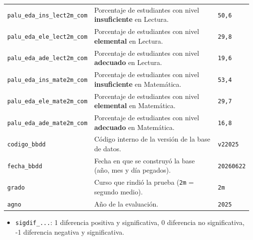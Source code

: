 \documentclass[10.5pt]{article}
\begin{document}
\begin{xltabular}{\linewidth}{@{}p{4.5cm} >{\raggedright\arraybackslash}X p{3.4cm}@{}}
\texttt{palu\_\allowbreak{}eda\_\allowbreak{}ins\_\allowbreak{}lect2m\_\allowbreak{}com} & Porcentaje de estudiantes con nivel \textbf{insuficiente} en Lectura. & \texttt{50,6} \\
\texttt{palu\_\allowbreak{}eda\_\allowbreak{}ele\_\allowbreak{}lect2m\_\allowbreak{}com} & Porcentaje de estudiantes con nivel \textbf{elemental} en Lectura. & \texttt{29,8} \\
\texttt{palu\_\allowbreak{}eda\_\allowbreak{}ade\_\allowbreak{}lect2m\_\allowbreak{}com} & Porcentaje de estudiantes con nivel \textbf{adecuado} en Lectura. & \texttt{19,6} \\
\texttt{palu\_\allowbreak{}eda\_\allowbreak{}ins\_\allowbreak{}mate2m\_\allowbreak{}com} & Porcentaje de estudiantes con nivel \textbf{insuficiente} en Matemática. & \texttt{53,4} \\
\texttt{palu\_\allowbreak{}eda\_\allowbreak{}ele\_\allowbreak{}mate2m\_\allowbreak{}com} & Porcentaje de estudiantes con nivel \textbf{elemental} en Matemática. & \texttt{29,7} \\
\texttt{palu\_\allowbreak{}eda\_\allowbreak{}ade\_\allowbreak{}mate2m\_\allowbreak{}com} & Porcentaje de estudiantes con nivel \textbf{adecuado} en Matemática. & \texttt{16,8} \\
\texttt{codigo\_\allowbreak{}bbdd} & Código interno de la versión de la base de datos. & \texttt{v22025} \\
\texttt{fecha\_\allowbreak{}bbdd} & Fecha en que se construyó la base (año, mes y día pegados). & \texttt{20260622} \\
\texttt{grado} & Curso que rindió la prueba (\texttt{2m} = segundo medio). & \texttt{2m} \\
\texttt{agno} & Año de la evaluación. & \texttt{2025} \\
\end{xltabular}

\begin{formulabox}
\begin{itemize}[leftmargin=1.1em,itemsep=2pt,topsep=2pt]
\item \texttt{sigdif\_\allowbreak{}...}: 1 diferencia positiva y significativa, 0 diferencia no significativa, -1 diferencia negativa y significativa.
\end{itemize}
\end{formulabox}
\end{document}
